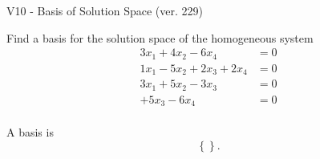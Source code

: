 \begin{exercise}
  \begin{exerciseTitle}V10 - Basis of Solution Space (ver. 229)\end{exerciseTitle}
  \begin{exerciseStatement}
    Find a basis for the solution space of the homogeneous system 
\begin{align*}
 3 x_ 1 + 4 x_ 2 -6 x_ 4 &= 0  \\ 
  1 x_ 1 -5 x_ 2 + 2 x_ 3 + 2 x_ 4 &= 0  \\ 
  3 x_ 1 + 5 x_ 2 -3 x_ 3 &= 0  \\ 
  + 5 x_ 3 -6 x_ 4 &= 0  \\ 
 \end{align*}


 
  \end{exerciseStatement}

  \begin{exerciseAnswer}
   A basis is   
\[\left\{\right\}.\]

  


  \end{exerciseAnswer}
\end{exercise}